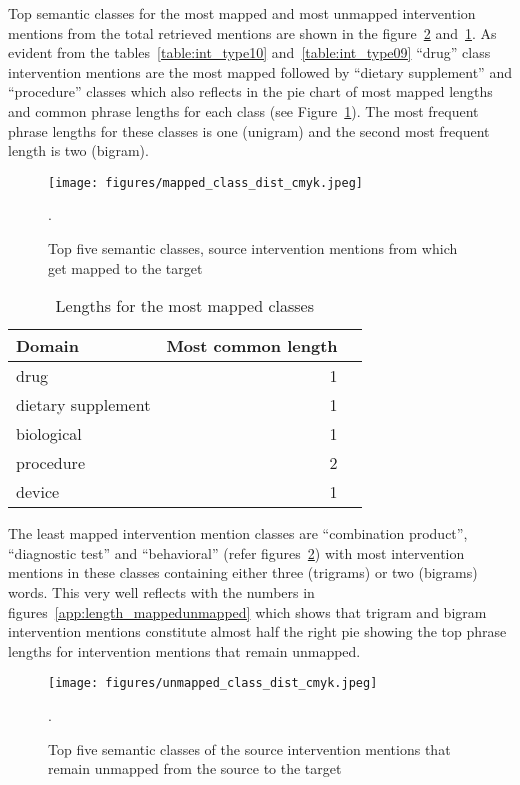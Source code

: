 \documentclass[letterpaper]{article} %
\begin{document}
Top semantic classes for the most mapped and most unmapped intervention mentions from the total retrieved mentions are shown in the figure~\ref{app:unmapped_class_dist} and~\ref{app:mapped_class_dist}.
As evident from the tables~\ref{table:int_type10} and~\ref{table:int_type09} ``drug'' class intervention mentions are the most mapped followed by ``dietary supplement'' and ``procedure'' classes which also reflects in the pie chart of most mapped lengths and common phrase lengths for each class (see Figure~\ref{app:mapped_class_dist}).
The most frequent phrase lengths for these classes is one (unigram) and the second most frequent length is two (bigram).
%
\begin{figure}[hbt!]
\centering
\texttt{[image: figures/mapped\_class\_dist\_cmyk.jpeg]}
\caption{Top five semantic classes, source intervention mentions from which get mapped to the target}.
\label{app:mapped_class_dist}
\end{figure}
%
\begin{table}[!htbp]
\centering
\begin{tabular}{lrl}
\hline \textbf{Domain} & \textbf{ Most common length } \\ \hline
drug & 1 \\
dietary supplement & 1 \\
biological & 1 \\
procedure & 2 \\
device & 1 \\
\hline
\end{tabular}
\caption{Lengths for the most mapped classes}
\label{table:len_mapped_classes} 
\end{table}
%
%
The least mapped intervention mention classes are ``combination product'', ``diagnostic test'' and ``behavioral'' (refer figures~\ref{app:unmapped_class_dist}) with most intervention mentions in these classes containing either three (trigrams) or two (bigrams) words.
This very well reflects with the numbers in figures~\ref{app:length_mappedunmapped} which shows that trigram and bigram intervention mentions constitute almost half the right pie showing the top phrase lengths for intervention mentions that remain unmapped.
%
\begin{figure}[hbt!]
\centering
\texttt{[image: figures/unmapped\_class\_dist\_cmyk.jpeg]}
\caption{Top five semantic classes of the source intervention mentions that remain unmapped from the source to the target}.
\label{app:unmapped_class_dist}
\end{figure}
\end{document}
